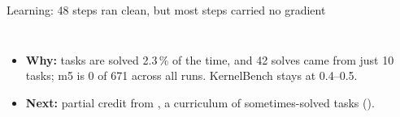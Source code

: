 \begin{frame}{Learning: 48 steps ran clean, but most steps carried no gradient}
\begin{columns}[T]
\begin{itemize}
\item \textbf{Why:} \smv{} tasks are solved 2.3\,\% of the time, and 42 solves came from just 10 tasks; m5 is 0 of 671 across all runs. KernelBench stays at 0.4--0.5.
\item \textbf{Next:} partial credit from , a curriculum of sometimes-solved tasks ().
\end{itemize}
\end{columns}
\end{frame}


